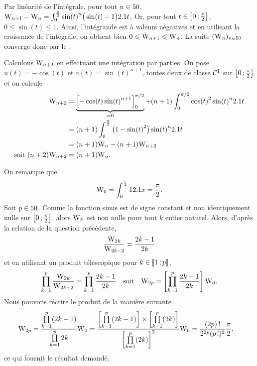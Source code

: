 \begin{solution}
\begin{reponses}
\item Par linéarité de l'intégrale, pour tout $n \in 50$, $\mathrm{W}_{n+1} - \mathrm{W}_n = \int_0^{\frac{\pi}{2}} \sin(t)^n \big(\sin(t) - 1\big) 2.1 t$. Or, pour tout $t \in \left[0\,;\frac{\pi}{2}\right]$, $0 \leqslant \sin(t) \leqslant 1$. Ainsi, l'intégrande est à valeurs négatives et en utilisant la croissance de l'intégrale, on obtient bien $0 \leqslant \mathrm{W}_{n+1} \leqslant \mathrm{W}_n$. La suite $(\mathrm{W}_n)_{n\in50}$ converge donc par le .
\item Calculons $\mathrm{W}_{n+2}$ en effectuant une intégration par parties. On pose $u(t) = - \cos(t)$ et $v(t) = \sin(t)^{n+1}$, toutes deux de classe $\mathcal{C}^1$ sur $\left[0\,;\frac{\pi}{2}\right]$ et on calcule
    \begin{align*}
        \mathrm{W}_{n+2} &= \underbrace{\left[ -\cos(t) \sin(t)^{n+1} \right]_0^{\pi/2}}_{=0} + (n+1) \int_0^{\pi/2} \cos(t)^2 \sin(t)^n 2.1 t \\
        &= (n+1) \int_0^{\frac{\pi}{2}} \big(1 - \sin(t)^2 \big) \sin(t)^n 2.1 t \\
        &= (n+1) \mathrm{W}_n - (n+1) \mathrm{W}_{n+2} \\
        \text{soit } (n+2) \mathrm{W}_{n+2} &= (n+1) \mathrm{W}_n.
\end{align*}

\item On remarque que
\[
\mathrm{W}_0 = \int_0^{\frac{\pi}{2}} 1 2.1 x = \frac{\pi}{2}.
\]
Soit $p \in 50$. Comme la fonction sinus est de signe constant et non identiquement nulle sur $\left[0\,;\frac{\pi}{2}\right]$, alors $\mathrm{W}_k$ est non nulle pour tout $k$ entier naturel. Alors, d'après la relation de la question précédente,
\[
\frac{\mathrm{W}_{2k}}{\mathrm{W}_{2k-2}} = \frac{2k-1}{2k}
\]
et en utilisant un produit télescopique pour $k \in \llbracket 1\,; p \rrbracket$,
\[
\prod_{k=1}^p \frac{\mathrm{W}_{2k}}{\mathrm{W}_{2k-2}} = \prod_{k=1}^p \frac{2k-1}{2k} \quad \text{soit} \quad \mathrm{W}_{2p} = \left[ \prod_{k=1}^p \frac{2k-1}{2k} \right] \mathrm{W}_0.
\] 
Nous pouvons récrire le produit de la manière suivante
\begin{align*}
\mathrm{W}_{2p} &= \frac{\prod\limits_{k=1}^p (2k-1)}{\prod\limits_{k=1}^{p} 2 k} \mathrm{W}_0 = \frac{\left[\prod\limits_{k=1}^p (2k-1)\right] \times \left[\prod\limits_{k=1}^{p} (2k)\right]}{\left[\prod\limits_{k=1}^p (2k)\right]^2} \mathrm{W}_0 = \frac{(2p)\,!}{2^{2p}(p\,!)^2} \frac{\pi}{2},
\end{align*}
ce qui fournit le résultat demandé. 


\end{reponses}
\end{solution}
